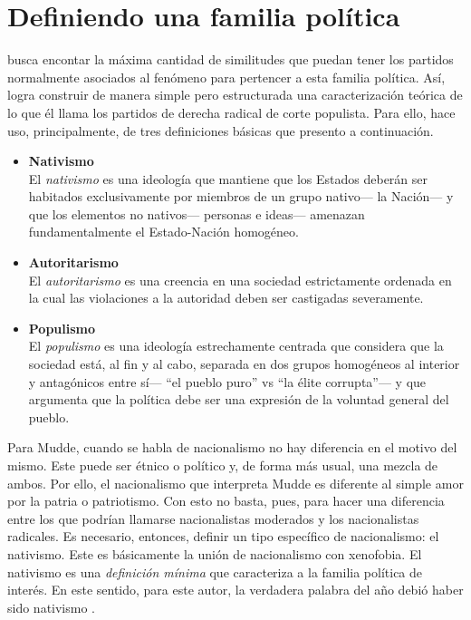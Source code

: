 \section{Definiendo una familia política}

\citeauthor{Mudde07a} busca encontar la máxima cantidad de similitudes que puedan tener los partidos normalmente asociados al fenómeno para pertencer a esta familia política. Así, logra construir de manera simple pero estructurada una caracterización teórica de lo que él llama los partidos de derecha radical de corte populista. Para ello, hace uso, principalmente, de tres definiciones básicas que presento a continuación.

\begin{itemize}
\item \textbf{Nativismo}\\
El \textit{nativismo} es una ideología que mantiene que los Estados deberán ser habitados exclusivamente por miembros de un grupo nativo--- la Nación--- y que los elementos no nativos--- personas e ideas--- amenazan fundamentalmente el Estado-Nación homogéneo.

\item \textbf{Autoritarismo}\\
El \textit{autoritarismo} es una creencia en una sociedad estrictamente ordenada en la cual las violaciones a la autoridad deben ser castigadas severamente.

\item \textbf{Populismo}\\
El \textit{populismo} es una ideología estrechamente centrada que considera que la sociedad está, al fin y al cabo, separada en dos grupos homogéneos al interior y antagónicos entre sí--- ``el pueblo puro'' vs ``la élite corrupta''--- y que argumenta que la política debe ser una expresión de la voluntad general del pueblo.
\end{itemize}

Para Mudde, cuando se habla de nacionalismo no hay diferencia en el motivo del mismo. Este puede ser étnico o político y, de forma más usual, una mezcla de ambos. Por ello, el nacionalismo que interpreta Mudde es diferente al simple amor por la patria o patriotismo. Con esto no basta, pues, para hacer una diferencia entre los que podrían llamarse nacionalistas moderados y los nacionalistas radicales. Es necesario, entonces, definir un tipo específico de nacionalismo: el nativismo. Este es básicamente la unión de nacionalismo con xenofobia. El nativismo es una \textit{definición mínima} que caracteriza a la familia política de interés. En este sentido, para este autor, la verdadera palabra del año debió haber sido nativismo \parencite{MuddeCambridge17}.\\

